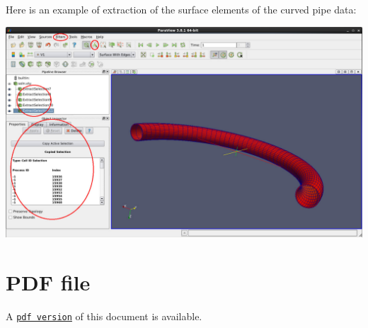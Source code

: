Here is an example of extraction of the surface elements of the curved pipe data\+:

 
\begin{DoxyImageNoCaption}
  \mbox{\includegraphics[width=\textwidth]{how_to_01}}
\end{DoxyImageNoCaption}




 

 \hypertarget{index_pdf}{}\section{P\+D\+F file}\label{index_pdf}
A \href{../latex/refman.pdf}{\tt pdf version} of this document is available. 
